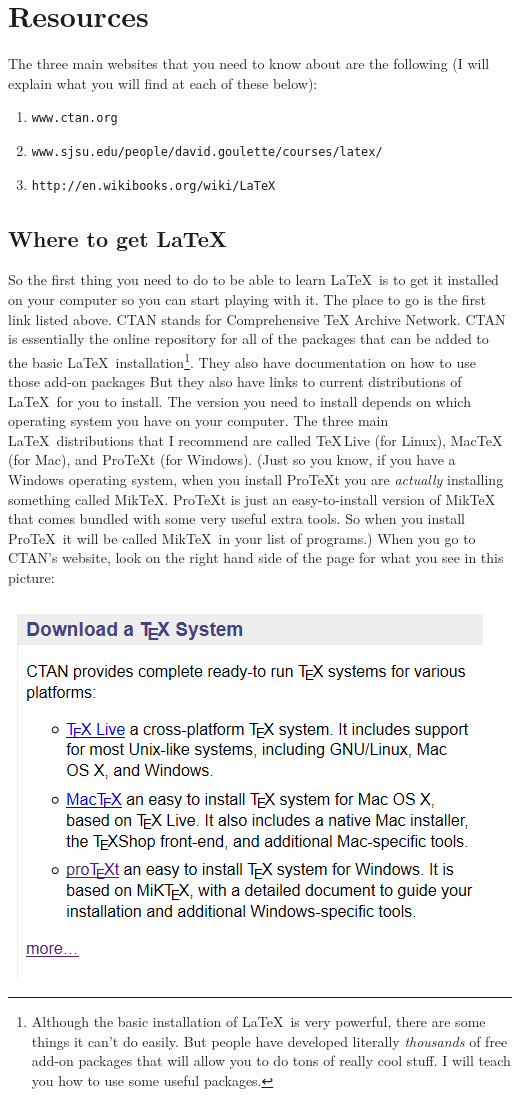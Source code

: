 \documentclass[11pt]{article}
\begin{document}
\section{Resources}
The three main websites that you need to know about are the following (I will explain what you will find at each of these below):
\begin{enumerate}
\item \verb|www.ctan.org|
\item \verb|www.sjsu.edu/people/david.goulette/courses/latex/|
\item \verb|http://en.wikibooks.org/wiki/LaTeX|
\end{enumerate}
\subsection{Where to get \LaTeX}
So the first thing you need to do to be able to learn \LaTeX\ is to get it installed on your computer so you can start playing with it. The place to go is the first link listed above.  CTAN stands for Comprehensive TeX Archive Network.  CTAN is essentially the online repository for all of the packages that can be added to the basic \LaTeX\ installation\footnote{Although the basic installation of \LaTeX\ is very powerful, there are some things it can't do easily.  But people have developed literally \emph{thousands} of free add-on packages that will allow you to do tons of really cool stuff.  I will teach you how to use some useful packages.}.  They also have documentation on how to use those add-on packages  But they also have links to current distributions of \LaTeX\ for you to install.  The version you need to install depends on which operating system you have on your computer.  The three main \LaTeX\ distributions that I recommend are called \TeX\,Live (for Linux), Mac\TeX\, (for Mac), and Pro\TeX t (for Windows). (Just so you know, if you have a Windows operating system, when you install Pro\TeX t you are \emph{actually} installing something called Mik\TeX. Pro\TeX t is just an easy-to-install version of Mik\TeX\, that comes bundled with some very useful extra tools.  So when you install Pro\TeX\, it will be called Mik\TeX\, in your list of programs.)  When you go to CTAN's website, look on the right hand side of the page for what you see in this picture:\\
\begin{center}
\includegraphics[width=.6\columnwidth]{Capture}
\end{center}
\end{document}

